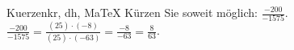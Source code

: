 \begin{MAufgabe}{Kuerzen}{kr, dh, MaTeX}
K\"urzen Sie soweit m\"oglich: $\frac{-200}{-1575}$.\\ 
\ifLsg\MLoesung
\quad $\frac{-200}{-1575}=\frac{(25)\cdot(-8)}{(25)\cdot(-63)}=\frac{-8}{-63}=\frac{8}{63}$.\else\relax\fi
 \end{MAufgabe}